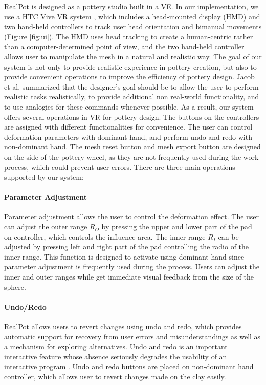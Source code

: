 \documentclass{svjour3}                     %
\begin{document}
RealPot is designed as a pottery studio built in a VE.
In our implementation, we use a HTC Vive VR system \cite{website:vive}, which includes a head-mounted display (HMD) and two hand-held controllers to track user head orientation and bimanual movements (Figure \ref{fig:ui}).
The HMD uses head tracking to create a human-centric rather than a computer-determined point of view, and the two hand-held controller allows user to manipulate the mesh in a natural and realistic way.
The goal of our system is not only to provide realistic experience in pottery creation, but also to provide convenient operations to improve the efficiency of pottery design. 
Jacob et al. \cite{Jacob2008Reality} summarized that the designer's goal should be to allow the user to perform realistic tasks realistically, to provide additional non real-world functionality, and to use analogies for these commands whenever possible.
As a result, our system offers several operations in VR for pottery design.
The buttons on the controllers are assigned with different functionalities for convenience. The user can control deformation parameters with dominant hand, and perform undo and redo with non-dominant hand.
The mesh reset button and mesh export button are designed on the side of the pottery wheel, as they are not frequently used during the work process, which could prevent user errors.
There are three main operations supported by our system:

\paragraph{Parameter Adjustment}
Parameter adjustment allows the user to control the deformation effect.
The user can adjust the outer range $R_{O}$ by pressing the upper and lower part of the pad on controller, which controls the influence area. The inner range $R_{I}$ can be adjusted by pressing left and right part of the pad controlling the radio of the inner range. This function is designed to activate using dominant hand since parameter adjustment is frequently used during the process. Users can adjust the inner and outer ranges while get immediate visual feedback from the size of the sphere.

\paragraph{Undo/Redo}
RealPot allows users to revert changes using undo and redo, which provides automatic support for recovery from user errors and misunderstandings as well as a mechanism for exploring alternatives.
Undo and redo is an important interactive feature whose absence seriously degrades the usability of an interactive program \cite{choudhary1995general}.
Undo and redo buttons are placed on non-dominant hand controller, which allows user to revert changes made on the clay easily.
\end{document}
